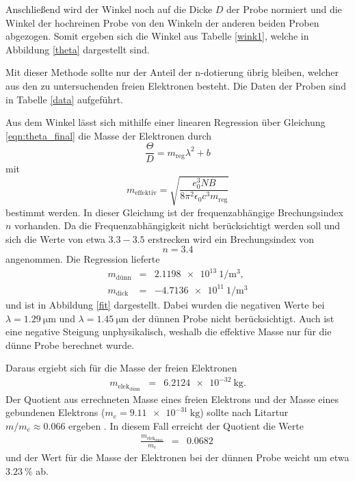 Anschließend wird der Winkel noch auf die Dicke $D$ der Probe normiert und die Winkel der hochreinen Probe von den Winkeln der anderen beiden Proben abgezogen.
Somit ergeben sich die Winkel aus Tabelle \ref{wink1}, welche in Abbildung \ref{theta} dargestellt sind.

Mit dieser Methode sollte nur der Anteil der n-dotierung übrig bleiben, welcher aus den zu untersuchenden freien Elektronen besteht.
Die Daten der Proben sind in Tabelle \ref{data} aufgeführt.

Aus dem Winkel lässt sich mithilfe einer linearen Regression über Gleichung \eqref{eqn:theta_final} die Masse der Elektronen durch
\begin{equation*}
	\frac{\Theta}{D} = m_\text{reg} \lambda^2 + b
\end{equation*}
mit
\begin{equation*}
	m_\text{effektiv} = \sqrt{\frac{e_0^3 N B}{8 \pi^2 \epsilon_0 c^3 m_\text{reg}}}
\end{equation*}
bestimmt werden.
In dieser Gleichung ist der frequenzabhängige Brechungsindex $n$ vorhanden. Da die Frequenzabhängigkeit nicht berücksichtigt werden soll und sich die Werte von etwa $3.3-3.5$ \cite{GeAs} erstrecken wird ein Brechungsindex von 
\begin{equation*}
	n = 3.4
\end{equation*}
angenommen.
Die Regression lieferte 
\begin{eqnarray*}
	m_\text{dünn} &=& \SI{ 2.1198e13}{1\per\meter^3},\\
	m_\text{dick} &=& \SI{-4.7136e11}{1\per\meter^3}
\end{eqnarray*}
und ist in Abbildung \ref{fit} dargestellt.
Dabei wurden die negativen Werte bei $\lambda = \SI{1.29}{\micro\meter}$ und $\lambda = \SI{1.45}{\micro\meter}$ der dünnen Probe nicht berücksichtigt.
Auch ist eine negative Steigung unphysikalisch, weshalb die effektive Masse nur für die dünne Probe berechnet wurde.

Daraus ergiebt sich für die Masse der freien Elektronen
\begin{eqnarray*}
	m_{\text{elek}_\text{dünn}} &=& \SI{6.2124e-32}{\kilogram}.
\end{eqnarray*}
Der Quotient aus errechneten Masse eines freien Elektrons und der Masse eines gebundenen Elektrons ($m_e = \SI{9.11e-31}{\kilogram}$) sollte nach Litartur $m/m_e \approx 0.066$ ergeben \cite{kittel}.
In diesem Fall erreicht der Quotient die Werte
\begin{eqnarray*}
	\frac{m_{\text{elek}_\text{dünn}}}{m_\text{e}} &=& \SI{0.0682}{}
\end{eqnarray*}
und der Wert für die Masse der Elektronen bei der dünnen Probe weicht um etwa $\SI{3.23}{\percent}$ ab.


